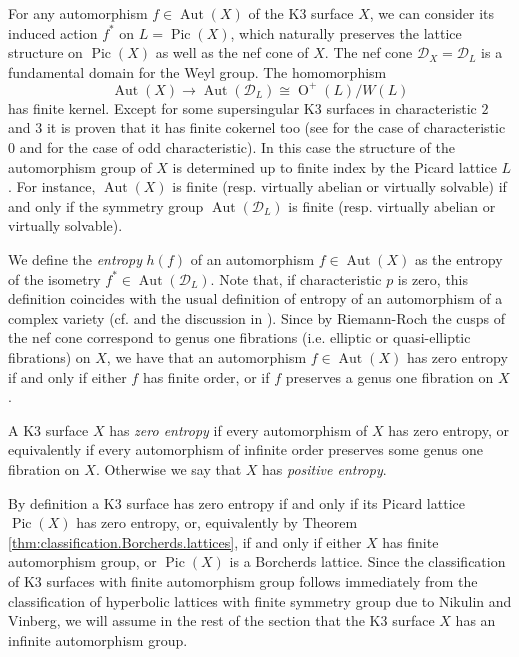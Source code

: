 \documentclass[11pt,letterpaper]{amsart}
\DeclareMathOperator{\Aut}{Aut}
\DeclareMathOperator{\Pic}{Pic}
\DeclareMathOperator{\Or}{O}
\begin{document}
For any automorphism $f\in \Aut(X)$ of the K3 surface $X$, we can consider its induced action $f^*$ on $L=\Pic(X)$, which naturally preserves the lattice structure on $\Pic(X)$ as well as the nef cone of $X$. The nef cone $\mathcal{D}_X=\mathcal{D}_L$ is a fundamental domain for the Weyl group. The homomorphism 
\[\Aut(X)\rightarrow \Aut(\mathcal{D}_L)\cong\Or^+(L)/W(L)\]
has finite kernel. Except for some supersingular K3 surfaces in characteristic $2$ and $3$ it is proven that it has finite cokernel too (see \cite[Theorem~15.2.6]{huybrechts.K3} for the case of characteristic $0$ and \cite[Theorem~6.1]{lieblich.maulik} for the case of odd characteristic). In this case the structure of the automorphism group of $X$ is determined up to finite index by the Picard lattice $L$. For instance, $\Aut(X)$ is finite (resp. virtually abelian or virtually solvable) if and only if the symmetry group $\Aut(\mathcal{D}_L)$ is finite (resp. virtually abelian or virtually solvable).

We define the \emph{entropy} $h(f)$ of an automorphism $f\in \Aut(X)$ as the entropy of the isometry $f^*\in \Aut(\mathcal{D}_L)$. Note that, if characteristic $p$ is zero, this definition coincides with the usual definition of entropy of an automorphism of a complex variety (cf. \cite[Théorème~2.1]{cantat.dynamics.K3.1} and the discussion in \cite{esnault.srinivas}). Since by Riemann-Roch the cusps of the nef cone correspond to genus one fibrations (i.e. elliptic or quasi-elliptic fibrations) on $X$, we have that an automorphism $f\in \Aut(X)$ has zero entropy if and only if either $f$ has finite order, or if $f$ preserves a genus one fibration  on $X$.

\begin{definition}
A K3 surface $X$ has \emph{zero entropy} if every automorphism of $X$ has zero entropy, or equivalently if every automorphism of infinite order preserves some genus one fibration on $X$. Otherwise we say that $X$ has \emph{positive entropy}.
\end{definition}
By definition a K3 surface has zero entropy if and only if its Picard lattice $\Pic(X)$ has zero entropy, or, equivalently by Theorem \ref{thm:classification.Borcherds.lattices}, if and only if either $X$ has finite automorphism group, or $\Pic(X)$ is a Borcherds lattice. Since the classification of K3 surfaces with finite automorphism group follows immediately from the classification of hyperbolic lattices with finite symmetry group due to Nikulin and Vinberg, we will assume in the rest of the section that the K3 surface $X$ has an infinite automorphism group.
\end{document}
